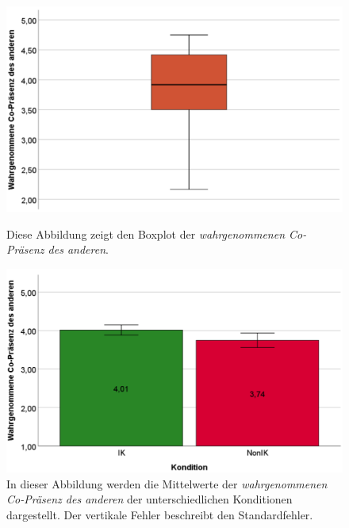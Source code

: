 \documentclass[a4paper,11pt]{article}%
\renewcommand{\\}{\vspace*{0.5\baselineskip} \newline}
\begin{document}
{	\begin{figure}[H]
   \begin{minipage}[t]{.5\linewidth} %
      \includegraphics[width=\linewidth]{Abbildungen/AuswertungDiagramme/Final/BP_OtherCoPresence.png}
      \caption[Boxplot der selbst wahrgenommenen Co-Präsenz des anderen]{Diese Abbildung zeigt den Boxplot der \textit{wahrgenommenen Co-Präsenz des anderen}.}
            \label{SD_OtherCoPresenceBP}
   \end{minipage}
   \hspace{.02\linewidth}%
   \begin{minipage}[t]{.5\linewidth} %
     \includegraphics[width=\linewidth]{Abbildungen/AuswertungDiagramme/Final/SD_OtherCoPresence_Mittelwerte.png}
      \caption[Durchschnittliche wahrgenommene Co-Präsenz des anderen der Konditionen]{In dieser Abbildung werden die Mittelwerte der \textit{wahrgenommenen Co-Präsenz des anderen} der unterschiedlichen Konditionen dargestellt. Der vertikale Fehler beschreibt den Standardfehler.}
       \label{SD_SelbstCoPresence_Mittelwerte}
   \end{minipage}
\end{figure}

}
\end{document}
